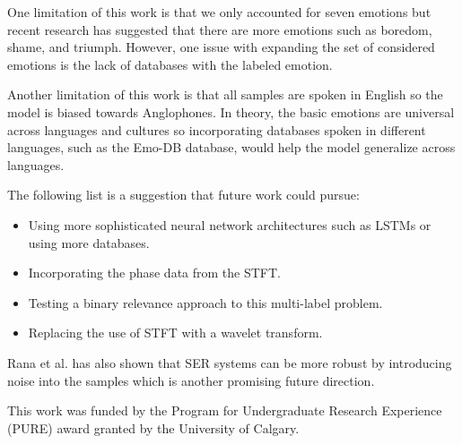 One limitation of this work is that we only accounted for seven emotions but recent research has suggested that there are more emotions such as boredom, shame, and triumph. \cite{Cordaro2018} However, one issue with expanding the set of considered emotions is the lack of databases with the labeled emotion.

Another limitation of this work is that all samples are spoken in English so the model is biased towards Anglophones. In theory, the basic emotions are universal across languages and cultures so incorporating databases spoken in different languages, such as the Emo-DB database, would help the model generalize across languages.\cite{Burkhardt2005}

The following list is a suggestion that future work could pursue:
\begin{itemize}
	\item Using more sophisticated neural network architectures such as LSTMs or using more databases.
	\item Incorporating the phase data from the STFT.
	\item Testing a binary relevance approach to this multi-label problem.
	\item Replacing the use of STFT with a wavelet transform.
\end{itemize}
Rana et al. \cite{Rana2016} has also shown that SER systems can be more robust by introducing noise into the samples which is another promising future direction.

\begin{acks}
This work was funded by the Program for Undergraduate Research Experience (PURE) award granted by the University of Calgary.
\end{acks}
